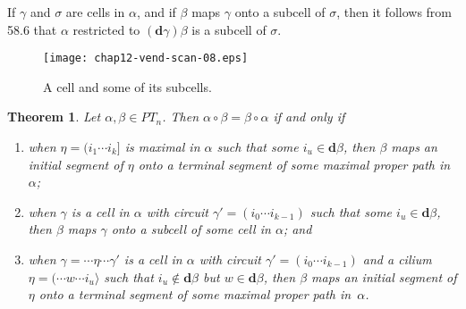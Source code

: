 \documentclass{surv-l}
\numberwithin{equation}{section}
\numberwithin{table}{section}
\numberwithin{figure}{section}
\newtheorem{theorem}[equation]{Theorem}
\theoremstyle{definition}
\begin{document}
If $\gamma$ and $\sigma$ are cells in $\alpha$, and if $\beta$
maps $\gamma$ onto a subcell of $\sigma$, then it follows from
58.6 that $\alpha$ restricted to $(\mathbf{d}\gamma)\beta$ is a
subcell of $\sigma$.


\setcounter{figure}{6}
\begin{figure}[!h]
\texttt{[image: chap12-vend-scan-08.eps]}
\caption{A cell and some of its subcells.\label{fig12.58.7}}
\end{figure}

\setcounter{equation}{7}
\begin{theorem}\label{thm12.58.8}
Let $\alpha,\beta\in PT_{n}$. Then $\alpha \circ\beta=\beta
\circ\alpha$ if and only if
\begin{enumerate}
\item[(\emph{i})] when $\eta=(i_{1}\cdots i_{k}]$ is maximal in
$\alpha$ such that some $i_{u}\in \mathbf{d}\beta$, then
$\beta$ maps an initial segment of $\eta$ onto a terminal
segment of some maximal proper path in~$\alpha$;

\item[(\emph{ii})] when $\gamma$ is a cell in $\alpha$ with circuit
$\gamma'=(i_{0}\cdots i_{k-1})$ such that some $i_{u}\in
\mathbf{d}\beta$, then $\beta$ maps $\gamma$ onto a subcell of
some cell in $\alpha$; and

\item[(\emph{ii})] when $\gamma=\cdots\eta\cdots\gamma'$ is a cell
in $\alpha$ with circuit $\gamma'=(i_{0}\cdots i_{k-1})$ and a
cilium $\eta=(\cdots w\cdots i_{u}\rangle$ such that
$i_{u}\not\in \mathbf{d}\beta$ but $w \in \mathbf{d}\beta$,
then $\beta$ maps an initial segment of $\eta$ onto a terminal
segment of some maximal proper path in~$\alpha$.
\end{enumerate}
\end{theorem}
\end{document}
